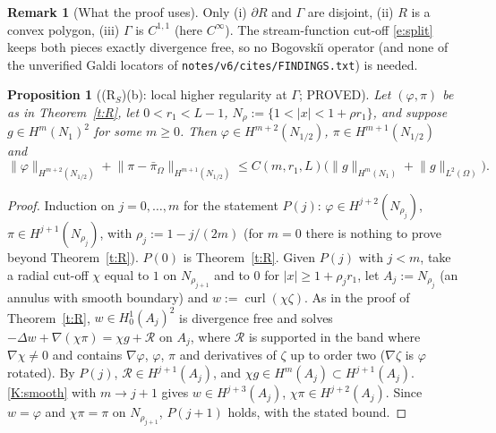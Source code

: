 \documentclass[11pt,reqno]{amsart}
\theoremstyle{plain}
\newtheorem{proposition}[theorem]{Proposition}
\theoremstyle{definition}
\newtheorem{remark}[theorem]{Remark}
\newcommand{\norm}[1]{\lVert #1\rVert}
\newcommand{\curl}{\operatorname{curl}}
\begin{document}
\begin{remark}[What the proof uses]
Only (i) $\partial R$ and $\Gamma$ are disjoint, (ii) $R$ is a convex polygon, (iii) $\Gamma$ is $C^{1,1}$ (here $C^\infty$). The stream-function cut-off \eqref{e:split} keeps both pieces exactly divergence free, so no Bogovski\u\i{} operator (and none of the unverified Galdi locators of \texttt{notes/v6/cites/FINDINGS.txt}) is needed.
\end{remark}

\begin{proposition}[(R$_S$)(b): local higher regularity at $\Gamma$; PROVED]\label{p:loc}
Let $(\varphi,\pi)$ be as in Theorem~\ref{t:R}, let $0<r_1<L-1$, $N_\rho:=\{1<|x|<1+\rho r_1\}$, and suppose $g\in H^m(N_1)^2$ for some $m\ge0$. Then $\varphi\in H^{m+2}(N_{1/2})$, $\pi\in H^{m+1}(N_{1/2})$ and
\[
\norm\varphi_{H^{m+2}(N_{1/2})}+\norm{\pi-\bar\pi_\Omega}_{H^{m+1}(N_{1/2})}\le C(m,r_1,L)\bigl(\norm g_{H^m(N_1)}+\norm g_{L^2(\Omega)}\bigr).
\]
\end{proposition}

\begin{proof}
Induction on $j=0,\dots,m$ for the statement $P(j)$: $\varphi\in H^{j+2}(N_{\rho_j})$, $\pi\in H^{j+1}(N_{\rho_j})$, with $\rho_j:=1-j/(2m)$ (for $m=0$ there is nothing to prove beyond Theorem~\ref{t:R}). $P(0)$ is Theorem~\ref{t:R}. Given $P(j)$ with $j<m$, take a radial cut-off $\chi$ equal to $1$ on $N_{\rho_{j+1}}$ and to $0$ for $|x|\ge1+\rho_jr_1$, let $A_j:=N_{\rho_j}$ (an annulus with smooth boundary) and $w:=\curl(\chi\zeta)$. As in the proof of Theorem~\ref{t:R}, $w\in H^1_0(A_j)^2$ is divergence free and solves $-\Delta w+\nabla(\chi\pi)=\chi g+\mathcal R$ on $A_j$, where $\mathcal R$ is supported in the band where $\nabla\chi\ne0$ and contains $\nabla\varphi$, $\varphi$, $\pi$ and derivatives of $\zeta$ up to order two ($\nabla\zeta$ is $\varphi$ rotated). By $P(j)$, $\mathcal R\in H^{j+1}(A_j)$, and $\chi g\in H^m(A_j)\subset H^{j+1}(A_j)$. \ref{K:smooth} with $m\to j+1$ gives $w\in H^{j+3}(A_j)$, $\chi\pi\in H^{j+2}(A_j)$. Since $w=\varphi$ and $\chi\pi=\pi$ on $N_{\rho_{j+1}}$, $P(j+1)$ holds, with the stated bound.
\end{proof}
\end{document}
